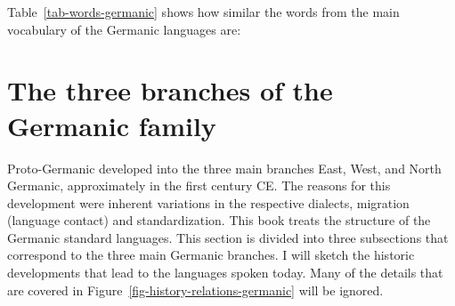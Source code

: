 Table~\vref{tab-words-germanic} shows how similar the words from the main vocabulary of the Germanic
languages are:
\begin{table}
\caption{\label{tab-words-germanic}Words from the main vocabulary of some Germanic languages}
\end{table}






\section{The three branches of the Germanic family}

Proto-Germanic developed into the three main branches East, West, and North Germanic, approximately in
the first century CE. The reasons for this development were inherent variations in the respective
dialects, migration (language contact) and standardization. This book treats the structure of the
Germanic standard languages. This section is divided into three subsections that correspond to the
three main Germanic branches. I will sketch the historic developments that lead to the
languages spoken today. Many of the details that are covered in Figure~\ref{fig-history-relations-germanic} will be ignored.



